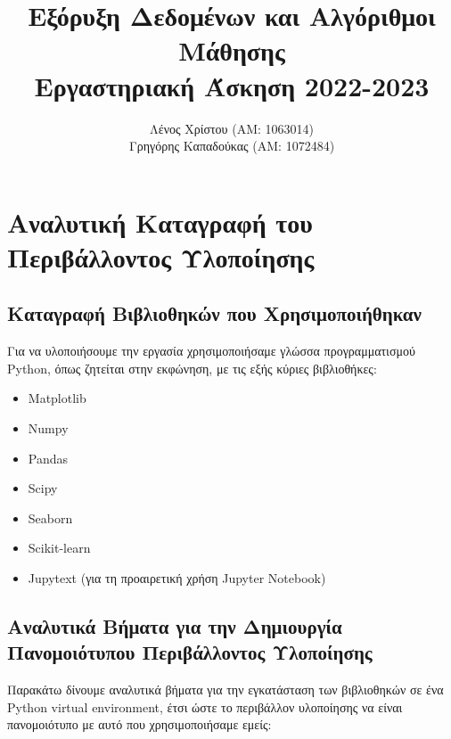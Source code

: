 \documentclass[12pt,a4paper]{article}
\title{Εξόρυξη Δεδομένων και Αλγόριθμοι Μάθησης\\Εργαστηριακή Άσκηση 2022-2023}
\author{Λένος Χρίστου (ΑΜ: 1063014)\\Γρηγόρης Καπαδούκας (ΑΜ: 1072484)}
\begin{document}
\maketitle

\setcounter{section}{-1}
\section{Αναλυτική Καταγραφή του Περιβάλλοντος Υλοποίησης}

\subsection{Καταγραφή Βιβλιοθηκών που Χρησιμοποιήθηκαν}
Για να υλοποιήσουμε την εργασία χρησιμοποιήσαμε γλώσσα προγραμματισμού\\ Python, όπως ζητείται στην εκφώνηση, με τις εξής κύριες βιβλιοθήκες:

\begin{itemize}
    \item Matplotlib
    \item Numpy
    \item Pandas
    \item Scipy
    \item Seaborn
    \item Scikit-learn
    \item Jupytext (για τη προαιρετική χρήση Jupyter Notebook)
\end{itemize}

\subsection{Αναλυτικά Βήματα για την Δημιουργία Πανομοιότυπου Περιβάλλοντος Υλοποίησης}
Παρακάτω δίνουμε αναλυτικά βήματα για την εγκατάσταση των βιβλιοθηκών σε ένα Python virtual environment, έτσι ώστε το περιβάλλον υλοποίησης να είναι πανομοιότυπο με αυτό που χρησιμοποιήσαμε εμείς:
\end{document}
